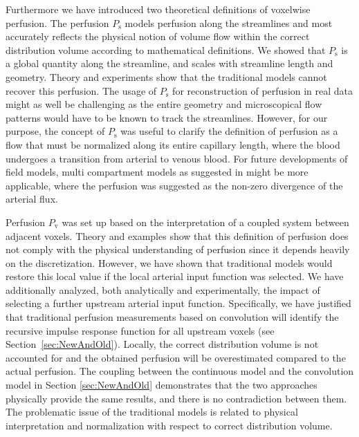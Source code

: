 \documentclass[journal,twocolumn]{IEEEtran}
\newcommand{\Perfv}{P_{\mathrm{v}}}
\newcommand{\Perfs}{P_{\mathrm{s}}}
\begin{document}
	Furthermore we have introduced two theoretical definitions of voxelwise perfusion.
	The perfusion $\Perfs$ models perfusion along the streamlines and most accurately reflects the physical notion of volume flow within the correct distribution volume according to mathematical definitions. We showed that $\Perfs$ is a global quantity along the streamline, and scales with streamline length and geometry.
	Theory and experiments show that the traditional models cannot recover this perfusion. The usage of $\Perfs$ for reconstruction of perfusion in real data might as well be challenging as the entire geometry and microscopical flow patterns would have to be known to track the streamlines. However, for our purpose, the concept of $\Perfs$ was useful to clarify the definition of perfusion as a flow that must be normalized along its entire capillary length, where the blood undergoes a transition from arterial to venous blood. 
	For future developments of field models, multi compartment models as suggested in \cite{sourbron14} might be more applicable, where the perfusion was suggested as the non-zero divergence of the arterial flux.

	Perfusion $\Perfv$ was set up based on the interpretation of a coupled system between adjacent voxels. 
	Theory and examples show that this definition of perfusion does not comply with the physical understanding of perfusion since it depends heavily on the discretization.
	However, we have shown that traditional models would restore this local value if the local arterial input function was selected. 
	We have additionally analyzed, both analytically and experimentally, the impact of selecting a further upstream arterial input function.
	Specifically, we have justified that traditional perfusion measurements based on convolution will identify the recursive impulse response function for all upstream voxels (see Section~\ref{sec:NewAndOld}). 
Locally, the correct distribution volume is not accounted for and the obtained perfusion will be overestimated compared to the actual perfusion. The coupling between the continuous model and the convolution model in Section \ref{sec:NewAndOld} demonstrates that the two approaches physically provide the same results, and there is no contradiction between them. The problematic issue of the traditional models is related to physical interpretation and normalization with respect to correct distribution volume.

	
	
\end{document}
